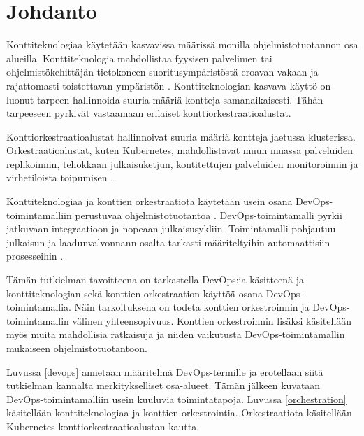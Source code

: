 \chapter{Johdanto\label{intro}}


Konttiteknologiaa käytetään kasvavissa määrissä monilla ohjelmistotuotannon osa alueilla.
Konttiteknologia mahdollistaa fyysisen palvelimen tai ohjelmistökehittäjän tietokoneen suoritusympäristöstä eroavan vakaan ja rajattomasti toistettavan ympäristön \cite{Watada19}.
Konttiteknologian kasvava käyttö on luonut tarpeen hallinnoida suuria määriä kontteja samanaikaisesti.
Tähän tarpeeseen pyrkivät vastaamaan erilaiset konttiorkestraatioalustat.

Konttiorkestraatioalustat hallinnoivat suuria määriä kontteja jaetussa klusterissa.
Orkestraatioalustat, kuten Kubernetes, mahdollistavat muun muassa palveluiden replikoinnin, tehokkaan julkaisuketjun, kontitettujen palveluiden monitoroinnin ja virhetiloista toipumisen \cite{Khan17}.

Konttiteknologiaa ja konttien orkestraatiota käytetään usein osana DevOps-toimintamalliin perustuvaa ohjelmistotuotantoa \cite{Kang16}.
DevOps-toimintamalli pyrkii jatkuvaan integraatioon ja nopeaan julkaisusykliin.
Toimintamalli pohjautuu julkaisun ja laadunvalvonnann osalta tarkasti määriteltyihin automaattisiin prosesseihin \cite{Jabbari16}.

Tämän tutkielman tavoitteena on tarkastella DevOps:ia käsitteenä ja konttiteknologian sekä konttien orkestraation käyttöä osana DevOps-toimintamallia.
Näin tarkoituksena on todeta konttien orkestroinnin ja DevOps-toimintamallin välinen yhteensopivuus.
Konttien orkestroinnin lisäksi käsitellään myös muita mahdollisia ratkaisuja ja niiden vaikutusta DevOps-toimintamallin mukaiseen ohjelmistotuotantoon.

Luvussa \ref{devops} annetaan määritelmä DevOps-termille ja erotellaan siitä tutkielman kannalta merkitykselliset osa-alueet.
Tämän jälkeen kuvataan DevOps-toimintamalliin usein kuuluvia toimintatapoja.
Luvussa \ref{orchestration} käsitellään konttiteknologiaa ja konttien orkestrointia. Orkestraatiota käsitellään Kubernetes-konttiorkestraatioalustan kautta.
